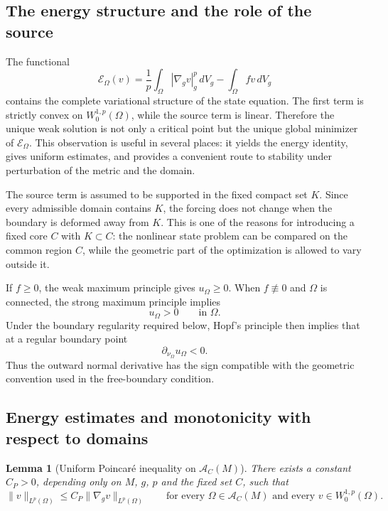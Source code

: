 \documentclass{article}
\newtheorem{lemma}[theorem]{Lemma}
\begin{document}
\subsection{The energy structure and the role of the source}

The functional
\[
\mathcal E_\Omega(v)
=
\frac1p\int_\Omega|\nabla_gv|_g^p\,dV_g
-\int_\Omega fv\,dV_g
\]
contains the complete variational structure of the state equation.
The first term is strictly convex on $W_0^{1,p}(\Omega)$, while the
source term is linear. Therefore the unique weak solution is not only
a critical point but the unique global minimizer of $\mathcal E_\Omega$.
This observation is useful in several places: it yields the energy
identity, gives uniform estimates, and provides a convenient route to
stability under perturbation of the metric and the domain.

The source term is assumed to be supported in the fixed compact set
$K$. Since every admissible domain contains $K$, the forcing does not
change when the boundary is deformed away from $K$. This is one of the
reasons for introducing a fixed core $C$ with $K\subset C$: the nonlinear
state problem can be compared on the common region $C$, while the
geometric part of the optimization is allowed to vary outside it.

If $f\geq0$, the weak maximum principle gives $u_\Omega\geq0$. When
$f\not\equiv0$ and $\Omega$ is connected, the strong maximum principle
implies
\[
u_\Omega>0\qquad\text{in }\Omega.
\]
Under the boundary regularity required below, Hopf's principle then
implies that at a regular boundary point
\[
\partial_{\nu_\Omega}u_\Omega<0.
\]
Thus the outward normal derivative has the sign compatible with the
geometric convention used in the free-boundary condition.

\subsection{Energy estimates and monotonicity with respect to domains}

\begin{lemma}[Uniform Poincar\'e inequality on $\mathcal A_C(M)$]
\label{lem:uniform-poincare}
There exists a constant $C_P>0$, depending only on $M$, $g$, $p$ and the
fixed set $C$, such that
\[
\|v\|_{L^p(\Omega)}\le C_P\|\nabla_g v\|_{L^p(\Omega)}
\qquad\text{for every }\Omega\in\mathcal A_C(M)
\text{ and every }v\in W_0^{1,p}(\Omega).
\]
\end{lemma}
\end{document}
